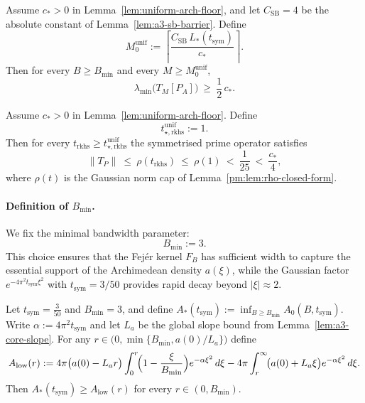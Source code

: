 \begin{corollary}\label{cor:uniform-discretisation}
Assume $c_*>0$ in Lemma~\ref{lem:uniform-arch-floor}, and let $C_{\mathrm{SB}}=4$ be the absolute constant of Lemma~\ref{lem:a3-sb-barrier}.
Define
\[
  M_{0}^{\mathrm{unif}}
  :=\left\lceil \frac{C_{\mathrm{SB}}\,L_*(t_{\mathrm{sym}})}{c_*}\right\rceil.
\]
Then for every $B\ge B_{\min}$ and every $M\ge M_{0}^{\mathrm{unif}}$,
\[
  \lambda_{\min}\bigl(T_M[P_A]\bigr)\ \ge\ \frac{1}{2}\,c_*.
\]
\end{corollary}

\begin{corollary}\label{cor:uniform-prime-cap}
Assume $c_*>0$ in Lemma~\ref{lem:uniform-arch-floor}. Define
\[
  t_{\star,\mathrm{rkhs}}^{\mathrm{unif}}:=1.
\]
Then for every $t_{\mathrm{rkhs}}\ge t_{\star,\mathrm{rkhs}}^{\mathrm{unif}}$ the symmetrised prime operator satisfies
\[
  \|T_P\|\ \le\ \rho(t_{\mathrm{rkhs}})\ \le\ \rho(1)\ <\ \frac{1}{25}\ <\ \frac{c_*}{4},
\]
where $\rho(t)$ is the Gaussian norm cap of Lemma~\ref{pm:lem:rho-closed-form}.
\end{corollary}


\paragraph{Definition of $B_{\min}$.}
We fix the minimal bandwidth parameter:
\begin{equation}\label{eq:Bmin-def}
  B_{\min} := 3.
\end{equation}
This choice ensures that the Fej\'er kernel $F_B$ has sufficient width to capture the essential support of the Archimedean density $a(\xi)$, while the Gaussian factor $e^{-4\pi^2 t_{\mathrm{sym}}\xi^2}$ with $t_{\mathrm{sym}}=3/50$ provides rapid decay beyond $|\xi|\approx 2$.

\begin{lemma}\label{lem:digamma-mean-bound}
Let $t_{\mathrm{sym}}=\frac{3}{50}$ and $B_{\min}=3$, and define
\(
  A_*(t_{\mathrm{sym}}):=\inf_{B\ge B_{\min}} A_0(B,t_{\mathrm{sym}}).
\)
Write $\alpha:=4\pi^2 t_{\mathrm{sym}}$ and let $L_a$ be the global slope bound from Lemma~\ref{lem:a3-core-slope}.
For any $r\in\bigl(0,\min\{B_{\min},a(0)/L_a\}\bigr)$ define
\[
  A_{\mathrm{low}}(r)
  := 4\pi\bigl(a(0)-L_a r\bigr)\int_{0}^{r}\!\Bigl(1-\frac{\xi}{B_{\min}}\Bigr)e^{-\alpha \xi^2}\,d\xi
     - 4\pi\int_{r}^{\infty}\!\bigl(a(0)+L_a \xi\bigr)e^{-\alpha \xi^2}\,d\xi.
\]
Then $A_*(t_{\mathrm{sym}})\ge A_{\mathrm{low}}(r)$ for every $r\in(0,B_{\min})$.
\end{lemma}

